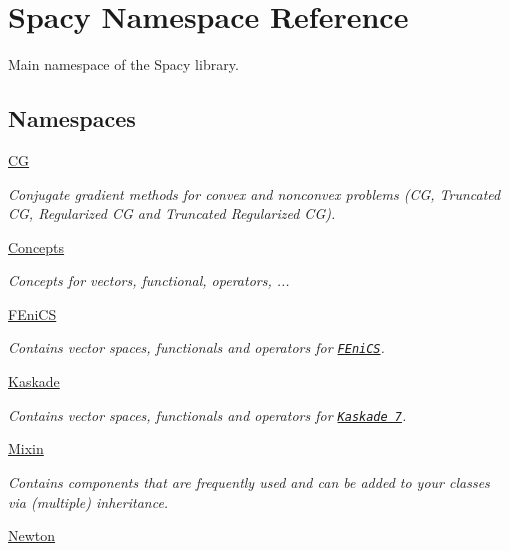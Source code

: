 \hypertarget{namespaceSpacy}{}\section{Spacy Namespace Reference}
\label{namespaceSpacy}


Main namespace of the Spacy library.  


\subsection*{Namespaces}
\begin{DoxyCompactItemize}
\item 
 \hyperlink{namespaceSpacy_1_1CG}{C\+G}
\begin{DoxyCompactList}\small\item\em Conjugate gradient methods for convex and nonconvex problems (C\+G, Truncated C\+G, Regularized C\+G and Truncated Regularized C\+G). \end{DoxyCompactList}\item 
 \hyperlink{namespaceSpacy_1_1Concepts}{Concepts}
\begin{DoxyCompactList}\small\item\em Concepts for vectors, functional, operators, ... \end{DoxyCompactList}\item 
 \hyperlink{namespaceSpacy_1_1FEniCS}{F\+Eni\+C\+S}
\begin{DoxyCompactList}\small\item\em Contains vector spaces, functionals and operators for \href{www.fenicsproject.org}{\tt F\+Eni\+C\+S}. \end{DoxyCompactList}\item 
 \hyperlink{namespaceSpacy_1_1Kaskade}{Kaskade}
\begin{DoxyCompactList}\small\item\em Contains vector spaces, functionals and operators for \href{http://www.zib.de/projects/kaskade7-finite-element-toolbox}{\tt Kaskade 7}. \end{DoxyCompactList}\item 
 \hyperlink{namespaceSpacy_1_1Mixin}{Mixin}
\begin{DoxyCompactList}\small\item\em Contains components that are frequently used and can be added to your classes via (multiple) inheritance. \end{DoxyCompactList}\item 
 \hyperlink{namespaceSpacy_1_1Newton}{Newton}

\end{DoxyCompactItemize}

